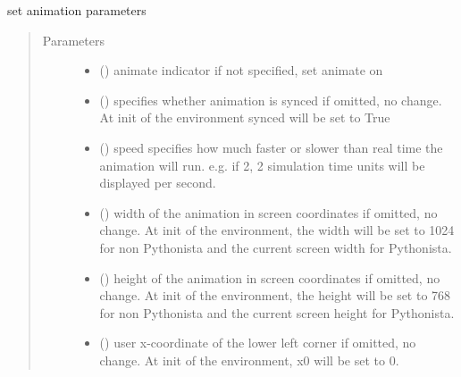 \documentclass[letterpaper,10pt,english]{sphinxmanual}
\begin{document}
\begin{fulllineitems}
\begin{fulllineitems}
\label{\detokenize{Reference:salabim.Environment.animation_parameters}}
set animation parameters
\begin{quote}\begin{description}
\item[{Parameters}] \leavevmode\begin{itemize}
\item {} 
 () \textendash{} animate indicator 
if not specified, set animate on 

\item {} 
 () \textendash{} specifies whether animation is synced 
if omitted, no change. At init of the environment synced will be set to True

\item {} 
 () \textendash{} speed 
specifies how much faster or slower than real time the animation will run.
e.g. if 2, 2 simulation time units will be displayed per second.

\item {} 
 () \textendash{} width of the animation in screen coordinates 
if omitted, no change. At init of the environment, the width will be
set to 1024 for non Pythonista and the current screen width for Pythonista.

\item {} 
 () \textendash{} height of the animation in screen coordinates 
if omitted, no change. At init of the environment, the height will be
set to 768 for non Pythonista and the current screen height for Pythonista.

\item {} 
 () \textendash{} user x-coordinate of the lower left corner 
if omitted, no change. At init of the environment, x0 will be set to 0.


\end{itemize}
\end{description}
\end{quote}
\end{fulllineitems}
\end{fulllineitems}
\end{document}
